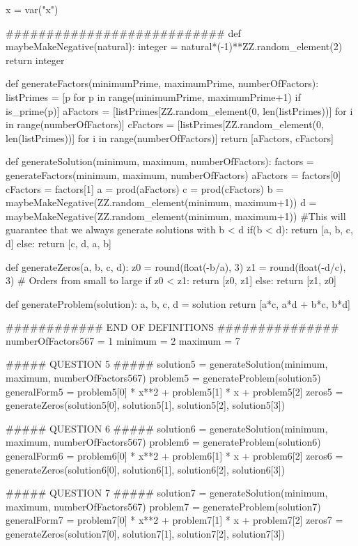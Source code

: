 \documentclass{ximera}
\begin{document}
\begin{sagesilent}
x = var("x")

###########################
def maybeMakeNegative(natural):
    integer = natural*(-1)**ZZ.random_element(2)
    return integer

def generateFactors(minimumPrime, maximumPrime, numberOfFactors):
    listPrimes = [p for p in range(minimumPrime, maximumPrime+1) if is_prime(p)]
    aFactors = [listPrimes[ZZ.random_element(0, len(listPrimes))] for i in range(numberOfFactors)]
    cFactors = [listPrimes[ZZ.random_element(0, len(listPrimes))] for i in range(numberOfFactors)]
    return [aFactors, cFactors]
    
def generateSolution(minimum, maximum, numberOfFactors):
    factors = generateFactors(minimum, maximum, numberOfFactors)
    aFactors = factors[0]
    cFactors = factors[1]
    a = prod(aFactors)
    c = prod(cFactors)
    b = maybeMakeNegative(ZZ.random_element(minimum, maximum+1))
    d = maybeMakeNegative(ZZ.random_element(minimum, maximum+1))
    #This will guarantee that we always generate solutions with b < d
    if(b < d):
        return [a, b, c, d]
    else:
        return [c, d, a, b]

def generateZeros(a, b, c, d):    
    z0 = round(float(-b/a), 3)
    z1 = round(float(-d/c), 3)
    # Orders from small to large
    if z0 < z1:
        return [z0, z1]
    else:
        return [z1, z0]

def generateProblem(solution):
    a, b, c, d = solution
    return [a*c, a*d + b*c, b*d]

############ END OF DEFINITIONS ###############
numberOfFactors567 = 1
minimum = 2
maximum = 7

##### QUESTION 5 #####
solution5 = generateSolution(minimum, maximum, numberOfFactors567)
problem5 = generateProblem(solution5)
generalForm5 = problem5[0] * x**2 + problem5[1] * x + problem5[2]
zeros5 = generateZeros(solution5[0], solution5[1], solution5[2], solution5[3])

##### QUESTION 6 #####
solution6 = generateSolution(minimum, maximum, numberOfFactors567)
problem6 = generateProblem(solution6)
generalForm6 = problem6[0] * x**2 + problem6[1] * x + problem6[2]
zeros6 = generateZeros(solution6[0], solution6[1], solution6[2], solution6[3])

##### QUESTION 7 #####
solution7 = generateSolution(minimum, maximum, numberOfFactors567)
problem7 = generateProblem(solution7)
generalForm7 = problem7[0] * x**2 + problem7[1] * x + problem7[2]
zeros7 = generateZeros(solution7[0], solution7[1], solution7[2], solution7[3])


\end{sagesilent}
\end{document}
